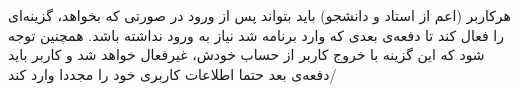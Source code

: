 هرکاربر (اعم از استاد و دانشجو) باید بتواند پس از ورود در صورتی که بخواهد، گزینه‌ای را فعال کند تا دفعه‌ی بعدی که وارد برنامه شد نیاز به ورود نداشته باشد. همچنین توجه شود که این گزینه با خروج کاربر از حساب خودش، غیرفعال خواهد شد و کاربر باید دفعه‌ی بعد حتما اطلاعات کاربری خود را مجددا وارد کند/